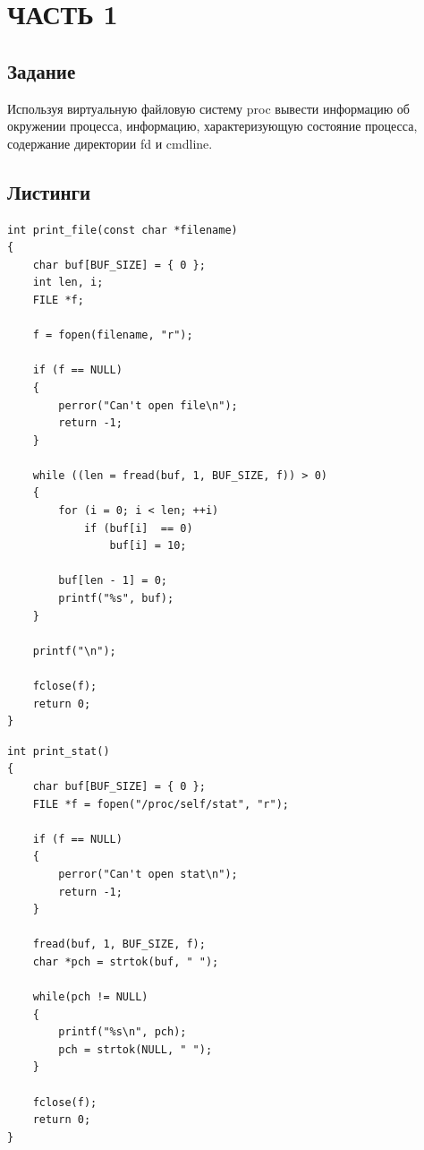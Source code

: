 \section{ЧАСТЬ 1}

\subsection{Задание}

Используя виртуальную файловую систему {\ttfamily proc} вывести
информацию об окружении процесса, информацию, характеризующую
состояние процесса, содержание директории {\ttfamily fd} и
{\ttfamily cmdline}.

\subsection{Листинги}

\begin{lstlisting}[caption=Вывод содержимого файла]
int print_file(const char *filename)
{
    char buf[BUF_SIZE] = { 0 };
    int len, i;
    FILE *f;

    f = fopen(filename, "r");

    if (f == NULL)
    {
        perror("Can't open file\n");
        return -1;
    }

    while ((len = fread(buf, 1, BUF_SIZE, f)) > 0)
    {
        for (i = 0; i < len; ++i)
            if (buf[i]  == 0)
                buf[i] = 10;

        buf[len - 1] = 0;
        printf("%s", buf);
    }

    printf("\n");

    fclose(f);
    return 0;
}
\end{lstlisting}

\begin{lstlisting}[caption=Вывод содержимого файла {\ttfamily stat}]
int print_stat()
{
    char buf[BUF_SIZE] = { 0 };
    FILE *f = fopen("/proc/self/stat", "r");

    if (f == NULL)
    {
        perror("Can't open stat\n");
        return -1;
    }

    fread(buf, 1, BUF_SIZE, f);
    char *pch = strtok(buf, " ");

    while(pch != NULL)
    {
        printf("%s\n", pch);
        pch = strtok(NULL, " ");
    }

    fclose(f);
    return 0;
}
\end{lstlisting}

